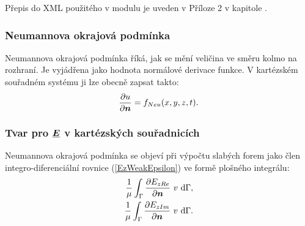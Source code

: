 \documentclass[12pt,a4paper,oneside]{article}
\numberwithin{equation}{section} %
\numberwithin{figure}{section} %
\numberwithin{table}{section} %
\renewcommand{\vec}[1]{\mbox{\boldmath$#1$}} %
\newcommand{\faz}[1]{{\underline{#1}}} %
\begin{document}
Přepis do XML použitého v modulu je uveden v Příloze 2 v kapitole .


\subsubsection{Neumannova okrajová podmínka}
Neumannova okrajová podmínka říká, jak se mění veličina ve směru kolmo na rozhraní. Je vyjádřena jako hodnota normálové derivace funkce. V kartézském souřadném systému ji lze obecně zapsat takto:
\begin{equation}
\frac{\partial u}{\partial \vec{n}} = f _{Neu} (x, y, z, t) .
\end{equation}

\subsubsection*{Tvar pro $\faz{\vec{E}}$ v kartézských souřadnicích}
\label{NeumannEK}
Neumannova okrajová podmínka se objeví při výpočtu slabých forem jako člen integro-diferenciální rovnice (\ref{EzWeakEpsilon}) ve formě plošného integrálu:
\begin{subequations}
\label{weakneumann}
\begin{align}
\frac{1}{\mu} \int _{\Gamma} \frac{\partial E _{z Re}}{\partial \vec{n}} ~ v ~ \ud \Gamma ,
\\ 
\frac{1}{\mu} \int _{\Gamma} \frac{\partial E _{z Im}}{\partial \vec{n}} ~ v ~ \ud \Gamma .
\end{align}
\end{subequations}
\end{document}
